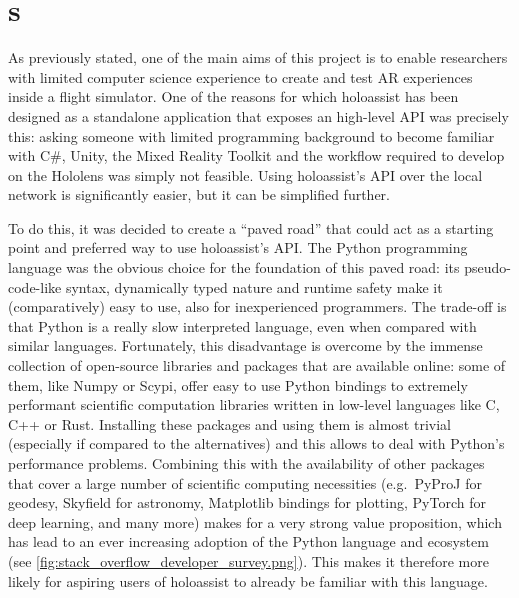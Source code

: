 
\chapter{s}\label{chapter:holoassistapps}

As previously stated, one of the main aims of this project is to enable researchers with limited computer science experience to create and test \gls{AR} experiences inside a flight simulator. One of the reasons for which \gls{holoassist} has been designed as a standalone application that exposes an high-level \gls{API} was precisely this: asking someone with limited programming background to become familiar with C\#, Unity, the Mixed Reality Toolkit and the workflow required to develop on the Hololens was simply not feasible. Using \gls{holoassist}'s \gls{API} over the local network is significantly easier, but it can be simplified further.

To do this, it was decided to create a \enquote{paved road}\cite{marsh_paved_nodate} that could act as a starting point and preferred way to use \gls{holoassist}'s \gls{API}. The Python programming language\cite{noauthor_python_nodate} was the obvious choice for the foundation of this paved road: its pseudo-code-like syntax, dynamically typed nature and runtime safety make it (comparatively) easy to use, also for inexperienced programmers. The trade-off is that Python is a really slow interpreted language, even when compared with similar languages. Fortunately, this disadvantage is overcome by the immense collection of open-source libraries and packages that are available online\cite{noauthor_pypi_nodate}: some of them, like Numpy\cite{noauthor_numpy_nodate} or Scypi\cite{noauthor_scipy_nodate}, offer easy to use Python bindings to extremely performant scientific computation libraries written in low-level languages like C, C++ or Rust. Installing these packages and using them is almost trivial (especially if compared to the alternatives) and this allows to deal with Python's performance problems. Combining this with the availability of other packages that cover a large number of scientific computing necessities (e.g.\ PyProJ\cite{noauthor_pyproj_nodate} for geodesy, Skyfield\cite{rhodes_skyfield_nodate} for astronomy, Matplotlib bindings\cite{noauthor_matplotlib_nodate} for plotting, PyTorch\cite{noauthor_pytorch_nodate} for deep learning, and many more) makes for a very strong value proposition, which has lead to an ever increasing adoption of the Python language and ecosystem (see \autoref{fig:stack_overflow_developer_survey.png}). This makes it therefore more likely for aspiring users of \gls{holoassist} to already be familiar with this language.

